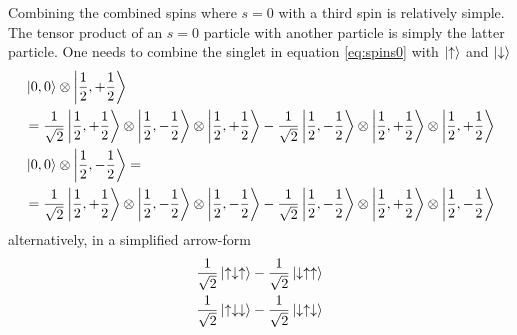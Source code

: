 \documentclass{article}
\begin{document}
Combining the combined spins where $s=0$ with a third spin is relatively simple. The tensor product of an $s=0$ particle with another particle is simply the latter particle. One needs to combine the singlet in equation \ref{eq:spins0} with $\ket{\uparrow}$ and $\ket{\downarrow}$
\begin{align*}
&\ket{0,0}\otimes\ket{\frac{1}{2},+\frac{1}{2}} \\
&=\frac{1}{\sqrt{2}}\ket{\frac{1}{2},+\frac{1}{2}}\otimes\ket{\frac{1}{2},-\frac{1}{2}}\otimes\ket{\frac{1}{2},+\frac{1}{2}}-\frac{1}{\sqrt{2}}\ket{\frac{1}{2},-\frac{1}{2}}\otimes\ket{\frac{1}{2},+\frac{1}{2}}\otimes\ket{\frac{1}{2},+\frac{1}{2}} \\
&\ket{0,0}\otimes\ket{\frac{1}{2},-\frac{1}{2}}= \\
&=\frac{1}{\sqrt{2}}\ket{\frac{1}{2},+\frac{1}{2}}\otimes\ket{\frac{1}{2},-\frac{1}{2}}\otimes\ket{\frac{1}{2},-\frac{1}{2}}-\frac{1}{\sqrt{2}}\ket{\frac{1}{2},-\frac{1}{2}}\otimes\ket{\frac{1}{2},+\frac{1}{2}}\otimes\ket{\frac{1}{2},-\frac{1}{2}}
\end{align*}
alternatively, in a simplified arrow-form
\begin{align}
\frac{1}{\sqrt{2}}\ket{\uparrow\downarrow\uparrow}-\frac{1}{\sqrt{2}}\ket{\downarrow\uparrow\uparrow} \\
\frac{1}{\sqrt{2}}\ket{\uparrow\downarrow\downarrow}-\frac{1}{\sqrt{2}}\ket{\downarrow\uparrow\downarrow}
\end{align}
\end{document}
